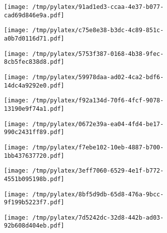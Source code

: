 \documentclass{article}
\begin{document}
\begin{figure}[htbp]
\begin{subfigure}[b]{.3\linewidth}
\texttt{[image: /tmp/pylatex/91ad1ed3-ccaa-4e37-b077-cad69d846e9a.pdf]}
\end{subfigure}
\begin{subfigure}[b]{.3\linewidth}
\texttt{[image: /tmp/pylatex/c75e8e38-b3dc-4c89-851c-a0b7d0116d71.pdf]}
\end{subfigure}
\begin{subfigure}[b]{.3\linewidth}
\texttt{[image: /tmp/pylatex/5753f387-0168-4b38-9fec-8cb5fec838d8.pdf]}
\end{subfigure}
\begin{subfigure}[b]{.3\linewidth}
\texttt{[image: /tmp/pylatex/59978daa-ad02-4ca2-bdf6-14dc4a9292e0.pdf]}
\end{subfigure}
\begin{subfigure}[b]{.3\linewidth}
\texttt{[image: /tmp/pylatex/f92a134d-70f6-4fcf-9078-13190e9f74a1.pdf]}
\end{subfigure}
\begin{subfigure}[b]{.3\linewidth}
\texttt{[image: /tmp/pylatex/0672e39a-ea04-4fd4-be17-990c2431ff89.pdf]}
\end{subfigure}
\begin{subfigure}[b]{.3\linewidth}
\texttt{[image: /tmp/pylatex/f7ebe102-10eb-4887-b700-1bb437637720.pdf]}
\end{subfigure}
\begin{subfigure}[b]{.3\linewidth}
\texttt{[image: /tmp/pylatex/3eff7060-6529-4e1f-b772-4551b095198b.pdf]}
\end{subfigure}
\begin{subfigure}[b]{.3\linewidth}
\texttt{[image: /tmp/pylatex/8bf5d9db-65d8-476a-9bcc-9f199b5223f7.pdf]}
\end{subfigure}
\begin{subfigure}[b]{.3\linewidth}
\texttt{[image: /tmp/pylatex/7d5242dc-32d8-442b-ad03-92b608d404eb.pdf]}
\end{subfigure}
\end{figure}
\end{document}
